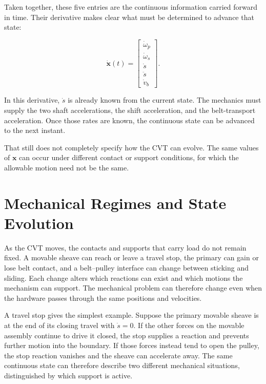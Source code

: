 \documentclass[11pt]{report}
\numberwithin{equation}{section}
\newcommand{\vect}[1]{\bm{#1}}
\begin{document}
Taken together, these five entries are the continuous information carried
forward in time. Their derivative makes clear what must be determined to
advance that state:

\begin{equation}
\dot{\vect{x}}(t)
=
\begin{bmatrix}
\dot{\omega}_p \\
\dot{\omega}_s \\
\dot{s} \\
\ddot{s} \\
\dot{v}_b
\end{bmatrix}.
\label{eq:state-derivative}
\end{equation}

In this derivative, \(\dot{s}\) is already known from the current state. The
mechanics must supply the two shaft accelerations, the shift acceleration, and
the belt-transport acceleration. Once those rates are known, the continuous
state can be advanced to the next instant.

That still does not completely specify how the CVT can evolve. The same values
of \(\vect{x}\) can occur under different contact or support conditions, for
which the allowable motion need not be the same.

\section{Mechanical Regimes and State Evolution}
\label{sec:mechanical_regimes_state_evolution}

As the CVT moves, the contacts and supports that carry load do not remain
fixed. A movable sheave can reach or leave a travel stop, the primary can gain
or lose belt contact, and a belt--pulley interface can change between sticking
and sliding. Each change alters which reactions can exist and which motions the
mechanism can support. The mechanical problem can therefore change even when
the hardware passes through the same positions and velocities.

A travel stop gives the simplest example. Suppose the primary movable sheave is
at the end of its closing travel with \(\dot{s}=0\). If the other forces on the
movable assembly continue to drive it closed, the stop supplies a reaction and
prevents further motion into the boundary. If those forces instead tend to open
the pulley, the stop reaction vanishes and the sheave can accelerate away. The
same continuous state can therefore describe two different mechanical
situations, distinguished by which support is active.
\end{document}
